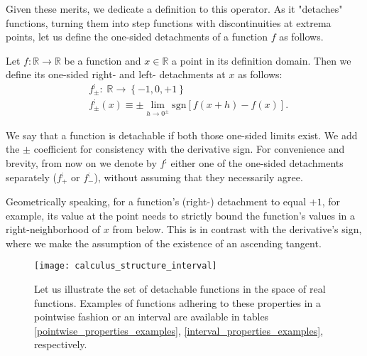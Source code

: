 \documentclass[11pt]{book}
\begin{document}
Given these merits, we dedicate a definition to this operator. As it "detaches" functions, turning them into step functions with discontinuities at extrema points, let us define the one-sided detachments of a function $f$ as follows.

\begin{definition}
Let $f:\mathbb{R}\rightarrow\mathbb{R}$ be a function and $x\in\mathbb{R}$ a point in its definition domain. Then we define its one-sided right- and left- detachments at $x$ as follows:
 $$\begin{array}{ccc}& f_{\pm}^{;}:\;\mathbb{R}\rightarrow\left\{ -1,0,+1\right\} \\
& f_{\pm}^{;}\left(x\right)\equiv \pm \underset{{\scriptscriptstyle h\rightarrow0^{\pm}}}{\lim}\text{sgn}\left[f\left(x+h\right)-f\left(x\right)\right].
\end{array}$$
\end{definition}

We say that a function is detachable if both those one-sided limits exist. We add the $\pm$ coefficient for consistency with the derivative sign. For convenience and brevity, from now on we denote by $f^;$ either one of the one-sided detachments separately ($f^;_+$ or $f^;_-$), without assuming that they necessarily agree.

Geometrically speaking, for a function's (right-) detachment to equal $+1$, for example, its value at the point needs to strictly bound the function's values in a right-neighborhood of $x$ from below. This is in contrast with the derivative's sign, where we make the assumption of the existence of an ascending tangent.

\begin{figure}[h!]
\texttt{[image: calculus\_structure\_interval]}
\caption{Let us illustrate the set of detachable functions in the space of real functions. Examples of functions adhering to these properties in a pointwise fashion or an interval are available in tables \ref{pointwise_properties_examples}, \ref{interval_properties_examples}, respectively.}
\label{calculus_structure_interval}
\end{figure}
\end{document}
